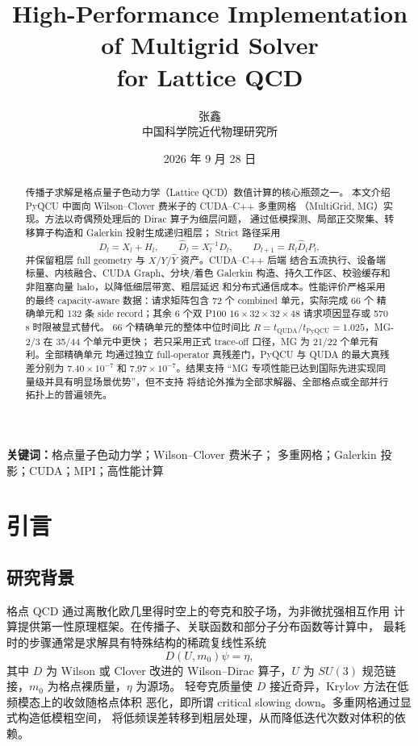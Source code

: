 \documentclass[UTF8,a4paper,11pt,fontset=none]{ctexart}
\title{\bfseries High-Performance Implementation of Multigrid Solver\\[0.35em]
for Lattice QCD}
\author{张鑫\\中国科学院近代物理研究所}
\date{2026 年 9 月 28 日}
\numberwithin{equation}{section}
\numberwithin{figure}{section}
\numberwithin{table}{section}
\newcommand{\code}[1]{\texttt{\detokenize{#1}}}
\newcommand{\PyQCU}{\mbox{PyQCU}}
\newcommand{\QUDA}{\mbox{QUDA}}
\begin{document}
\maketitle
\thispagestyle{empty}

\begin{abstract}
传播子求解是格点量子色动力学（Lattice QCD）数值计算的核心瓶颈之一。
本文介绍 PyQCU 中面向 Wilson--Clover 费米子的 CUDA--C++ 多重网格
（MultiGrid, MG）实现。方法以奇偶预处理后的 Dirac 算子为细层问题，
通过低模探测、局部正交聚集、转移算子构造和 Galerkin 投射生成递归粗层；
Strict 路径采用
\[
D_l=X_l+H_l,\qquad
\widehat D_l=X_l^{-1}D_l,\qquad
D_{l+1}=R_l\widehat D_lP_l,
\]
并保留粗层 full geometry 与 \(X/Y/\widehat Y\) 资产。CUDA--C++ 后端
结合五流执行、设备端标量、内核融合、CUDA Graph、分块/着色 Galerkin
构造、持久工作区、校验缓存和非阻塞向量 halo，以降低细层带宽、粗层延迟
和分布式通信成本。性能评价严格采用 \code{git tag test27} 的最终
capacity-aware 数据：请求矩阵包含 72 个 combined 单元，实际完成 66 个
精确单元和 132 条 side record；其余 6 个双 P100 \code{c64}
\(16\times32\times32\times48\) 请求项因显存或 570 s 时限被显式替代。
66 个精确单元的整体中位时间比
\(R=t_{\QUDA}/t_{\PyQCU}=1.025\)，MG-2/3 在 35/44 个单元中更快；
若只采用正式 trace-off 口径，MG 为 21/22 个单元有利。全部精确单元
均通过独立 full-operator 真残差门，PyQCU 与 QUDA 的最大真残差分别为
\(7.40\times10^{-7}\) 和 \(7.97\times10^{-7}\)。结果支持
“MG 专项性能已达到国际先进实现同量级并具有明显场景优势”，但不支持
将结论外推为全部求解器、全部格点或全部并行拓扑上的普遍领先。
\end{abstract}

\noindent\textbf{关键词：}格点量子色动力学；Wilson--Clover 费米子；
多重网格；Galerkin 投影；CUDA；MPI；高性能计算

\section{引言}

\subsection{研究背景}

格点 QCD 通过离散化欧几里得时空上的夸克和胶子场，为非微扰强相互作用
计算提供第一性原理框架。在传播子、关联函数和部分子分布函数等计算中，
最耗时的步骤通常是求解具有特殊结构的稀疏复线性系统
\begin{equation}
 D(U,m_0)\psi=\eta,
\label{eq:propagator}
\end{equation}
其中 \(D\) 为 Wilson 或 Clover 改进的 Wilson--Dirac 算子，\(U\) 为
\(SU(3)\) 规范链接，\(m_0\) 为格点裸质量，\(\eta\) 为源场。
轻夸克质量使 \(D\) 接近奇异，Krylov 方法在低频模态上的收敛随格点体积
恶化，即所谓 critical slowing down。多重网格通过显式构造低模粗空间，
将低频误差转移到粗层处理，从而降低迭代次数对体积的依赖。
\end{document}
